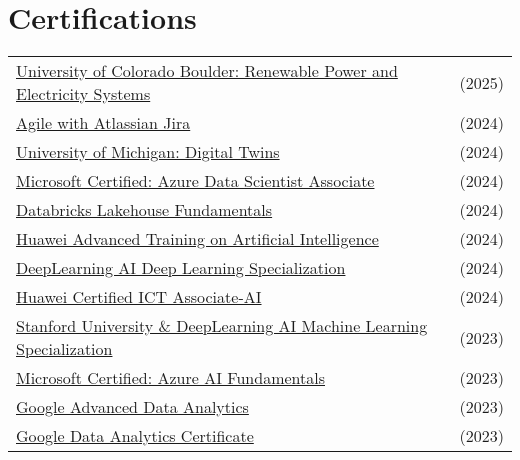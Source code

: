 \documentclass[a4paper,10pt]{article}
\begin{document}
\section{Certifications}
\begin{tabularx}{\linewidth}{@{}l X@{}}
\href{https://balcortex.github.io/assets/certifications/coursera_renewable_power.pdf}{University of Colorado Boulder: Renewable Power and Electricity Systems} & \hfill (2025) \\
\href{https://balcortex.github.io/assets/certifications/coursera_agile_attlassian_jira.pdf}{Agile with Atlassian Jira} & \hfill (2024) \\
\href{https://balcortex.github.io/assets/certifications/coursera_digital_twins.pdf}{University of Michigan: Digital Twins} & \hfill (2024) \\
\href{https://balcortex.github.io/assets/certifications/microsoft_azure_data_scientist_associate.pdf}{Microsoft Certified: Azure Data Scientist Associate} & \hfill (2024) \\
\href{https://balcortex.github.io/assets/certifications/databricks_lakehouse_fundamentals.pdf}{Databricks Lakehouse Fundamentals} & \hfill (2024) \\
\href{https://balcortex.github.io/assets/certifications/huawei_ia_1000_certificate.pdf}{Huawei Advanced Training on Artificial Intelligence} & \hfill (2024) \\
\href{https://balcortex.github.io/assets/certifications/coursera_deep_learning.pdf}{DeepLearning AI Deep Learning Specialization} & \hfill (2024) \\
\href{https://balcortex.github.io/assets/certifications/huawei_certification.pdf}{Huawei Certified ICT Associate-AI} & \hfill (2024) \\
\href{https://balcortex.github.io/assets/certifications/coursera_machine_learning.pdf}{Stanford University \& DeepLearning AI Machine Learning Specialization} & \hfill (2023) \\
\href{https://balcortex.github.io/assets/certifications/microsoft_azure_ai_fundamentals.pdf}{Microsoft Certified: Azure AI Fundamentals} & \hfill (2023) \\
\href{https://balcortex.github.io/assets/certifications/coursera_google_advanced_data_analytics.pdf}{Google Advanced Data Analytics} & \hfill (2023) \\
\href{https://balcortex.github.io/assets/certifications/coursera_google_data_analytics.pdf}{Google Data Analytics Certificate} & \hfill (2023) \\
\end{tabularx}
\end{document}
